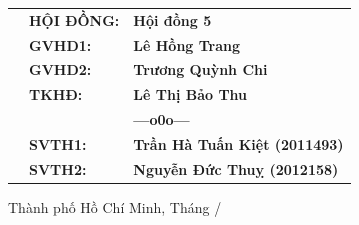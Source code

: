 \documentclass[12pt, a4paper]{report}
\theoremstyle{definition}
\begin{document}
\begin{titlepage}
    \vspace{1cm}
    \begin{table}[h]
        \resizebox{\textwidth}{!} {
            \begin{tabular}{rll}
                \hspace{4 cm}
                 & \textbf{\Large HỘI ĐỒNG:} & \textbf{\Large Hội đồng 5}                  \\
                 & \textbf{\Large GVHD1:}    & \textbf{\Large Lê Hồng Trang}               \\
                 & \textbf{\Large GVHD2:}    & \textbf{\Large Trương Quỳnh Chi}            \\
                 & \textbf{\Large TKHĐ:}     & \textbf{\Large Lê Thị Bảo Thu}              \\
                 &                           & \textbf{---o0o---}                          \\
                 & \textbf{\Large SVTH1:}    & \textbf{\Large Trần Hà Tuấn Kiệt (2011493)} \\
                 & \textbf{\Large SVTH2:}    & \textbf{\Large Nguyễn Đức Thuỵ (2012158)}
            \end{tabular}
        }
    \end{table}
    \vspace{1cm}

    \begin{center}
        {\large Thành phố Hồ Chí Minh, Tháng \the\month/\the\year}
    \end{center}
\end{titlepage}


\newpage


\end{document}
